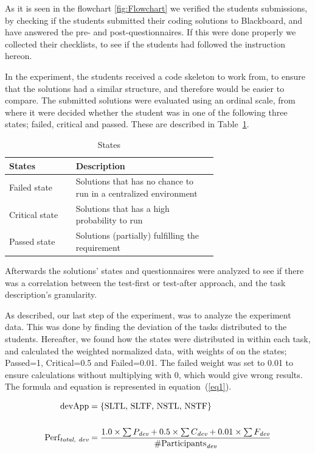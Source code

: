 \documentclass{sig-alternate-05-2015}
\begin{document}
As it is seen in the flowchart \ref{fig:Flowchart} we verified the students submissions, by checking if the students submitted their coding solutions to Blackboard, and have answered the pre- and post-questionnaires. If this were done properly we collected their checklists, to see if the students had followed the instruction hereon.

In the experiment, the students received a code skeleton to work from, to ensure that the solutions had a similar structure, and therefore would be easier to compare. The submitted solutions were evaluated using an ordinal scale, from where it were decided whether the student was in one of the following three states; failed, critical and passed. These are described in Table~\ref{StatesTable}.

\begin{table}[!ht]
\centering
\caption{States}
\label{StatesTable}
\begin{tabular}{|l|p{0.68\linewidth}|}
\hline
\textbf{States} & \textbf{Description} \\
\hline
\hline
Failed state & Solutions that has no chance to run in a centralized environment \\
Critical state & Solutions that has a high probability to run \\
Passed state & Solutions (partially) fulfilling the requirement \\
\hline
\end{tabular}
\end{table}

Afterwards the solutions' states and questionnaires were analyzed to see if there was a correlation between the test-first or test-after approach, and the task description's granularity.

As described, our last step of the experiment, was to ana\-lyze the experiment data. This was done by finding the deviation of the tasks distributed to the students. Hereafter, we found how the states were distributed in within each task, and calculated the weighted normalized data, with weights of on the states; Passed=1, Critical=0.5 and Failed=0.01. The failed weight was set to 0.01 to ensure calculations without multiplying with 0, which would give wrong results.
The formula and equation is represented in equation~(\ref{eq1}).

\begin{equation}\label{eq1}
\begin{split}
\text{devApp} &= \{\text{SLTL, SLTF, NSTL, NSTF}\} \\
& \\
\text{Perf}_{\emph{total, dev}} &= \dfrac{1.0\times \sum{P_{\emph{dev}}}+0.5\times \sum {C_{\emph{dev}}}+0.01\times \sum{ F_{\emph{dev}}}}{\# \text{Participants}_{\emph{dev}}}
\end{split}
\end{equation}
\end{document}
